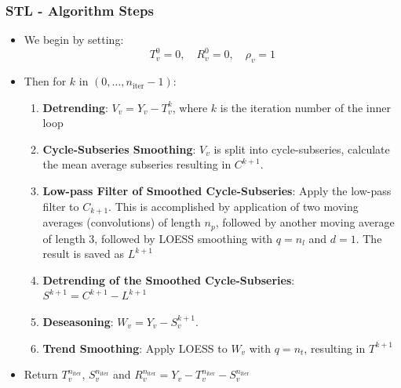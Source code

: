 \documentclass[presentation.tex]{subfiles}
\begin{document}
\begin{frame}
  \frametitle{STL - Algorithm Steps}
  \begin{itemize}
  \item We begin by setting:
    \[ T_v^{0} = 0, \quad R_v^{0} = 0,  \quad \rho_v = 1 \]
  \item Then for $k$ in $(0, \hdots, n_{\text{iter}}-1)$:
\begin{enumerate}
\item \textbf{Detrending}:
  $V_v = Y_v - T_v^k$, where $k$ is the iteration number of the inner loop
\item \textbf{Cycle-Subseries Smoothing}:
  $V_v$ is split into cycle-subseries, calculate the mean average subseries
  resulting in $C^{k+1}$.
\item \textbf{Low-pass Filter of Smoothed Cycle-Subseries}:
  Apply the low-pass filter to $C_{k+1}$. This is accomplished by application of two
  moving averages (convolutions) of length $n_p$, followed by another moving average of length 3,
  followed by LOESS smoothing with $q=n_l$
  and $d=1$. The result is saved as $L^{k+1}$
\item \textbf{Detrending of the Smoothed Cycle-Subseries}:
  $S^{k+1} = C^{k+1} - L^{k+1}$
\item \textbf{Deseasoning}:
  $W_v = Y_v - S_v^{k+1}$. 
\item \textbf{Trend Smoothing}:
  Apply LOESS to $W_v$ with $q = n_t$, resulting in $T^{k+1}$
\end{enumerate}
\item  Return $T^{n_{\text{iter}}}_v$, $S^{n_{\text{iter}}}_v$ and $R^{n_{\text{iter}}}_v = Y_v - T^{n_{\text{iter}}}_v - S^{n_{\text{iter}}}_v$
  \end{itemize}
\end{frame}
\end{document}
